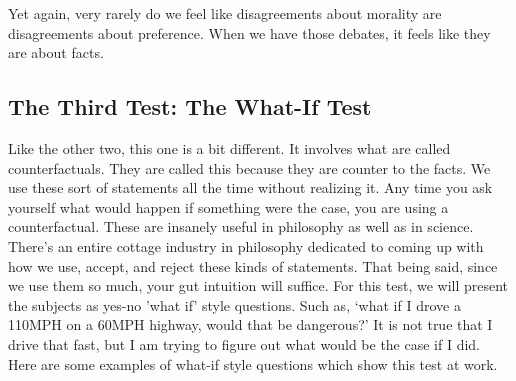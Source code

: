 Yet again, very rarely do we feel like disagreements about morality are disagreements about preference. When we have those debates, it feels like they are about facts.
\subsection{The Third Test: The What-If Test}

Like the other two, this one is a bit different. It involves what are called counterfactuals. They are called this because they are counter to the facts. We use these sort of statements all the time without realizing it. Any time you ask yourself what would happen if something were the case, you are using a counterfactual. These are insanely useful in philosophy as well as in science. There's an entire cottage industry in philosophy dedicated to coming up with how we use, accept, and reject these kinds of statements. That being said, since we use them so much, your gut intuition will suffice. For this test, we will present the subjects as yes-no 'what if' style questions. Such as, ‘what if I drove a 110MPH on a 60MPH highway, would that be dangerous?’ It is not true that I drive that fast, but I am trying to figure out what would be the case if I did. Here are some examples of what-if style questions which show this test at work.
 

